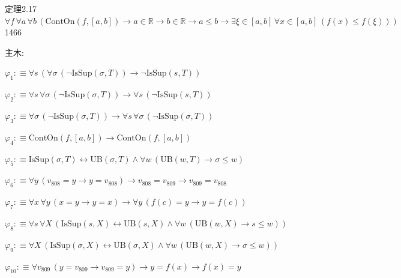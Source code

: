 \begin{fullproof}{定理2.17}{$\forall f\,\forall a\,\forall b\,(\mathrm{ContOn}(f,[a,b]) \to a \in \mathbb{R} \to b \in \mathbb{R} \to a \leq b \to \exists \xi \in [a,b]\,\forall x \in [a,b]\,(f(x) \leq f(\xi)))$}{1466}
\begin{ptree}
\end{ptree}
\noindent 主木:
\begin{ptree}
\noLine
{}
\end{ptree}
\begin{abbrevlist}
\item $\varphi_{1} :\equiv \forall s\,(\forall \sigma\,(\neg \mathrm{IsSup}(\sigma,T)) \to \neg \mathrm{IsSup}(s,T))$
\item $\varphi_{2} :\equiv \forall s\,\forall \sigma\,(\neg \mathrm{IsSup}(\sigma,T)) \to \forall s\,(\neg \mathrm{IsSup}(s,T))$
\item $\varphi_{3} :\equiv \forall \sigma\,(\neg \mathrm{IsSup}(\sigma,T)) \to \forall s\,\forall \sigma\,(\neg \mathrm{IsSup}(\sigma,T))$
\item $\varphi_{4} :\equiv \mathrm{ContOn}(f,[a,b]) \to \mathrm{ContOn}(f,[a,b])$
\item $\varphi_{5} :\equiv \mathrm{IsSup}(\sigma,T) \leftrightarrow \mathrm{UB}(\sigma,T) \land \forall w\,(\mathrm{UB}(w,T) \to \sigma \leq w)$
\item $\varphi_{6} :\equiv \forall y\,(v_{808} = y \to y = v_{808}) \to v_{808} = v_{809} \to v_{809} = v_{808}$
\item $\varphi_{7} :\equiv \forall x\,\forall y\,(x = y \to y = x) \to \forall y\,(f(c) = y \to y = f(c))$
\item $\varphi_{8} :\equiv \forall s\,\forall X\,(\mathrm{IsSup}(s,X) \leftrightarrow \mathrm{UB}(s,X) \land \forall w\,(\mathrm{UB}(w,X) \to s \leq w))$
\item $\varphi_{9} :\equiv \forall X\,(\mathrm{IsSup}(\sigma,X) \leftrightarrow \mathrm{UB}(\sigma,X) \land \forall w\,(\mathrm{UB}(w,X) \to \sigma \leq w))$
\item $\varphi_{10} :\equiv \forall v_{809}\,(y = v_{809} \to v_{809} = y) \to y = f(x) \to f(x) = y$

\end{abbrevlist}
\end{fullproof}
